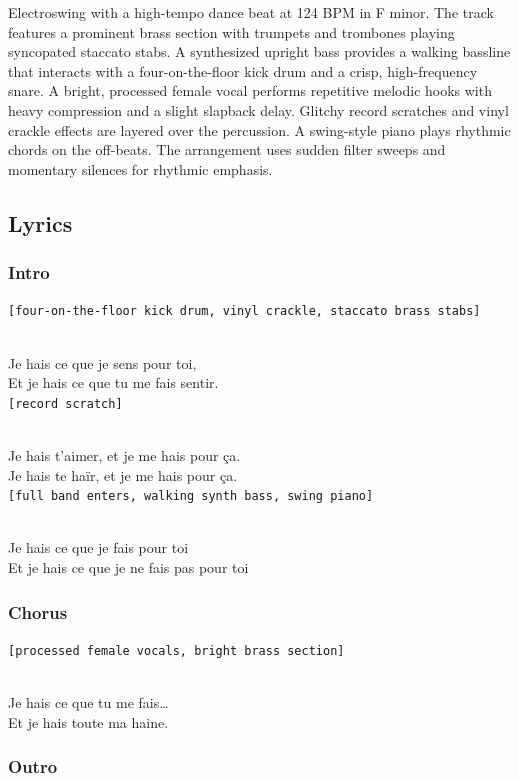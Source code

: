 \documentclass[]{article}
\begin{document}
Electroswing with a high-tempo dance beat at 124 BPM in F minor. The
track features a prominent brass section with trumpets and trombones
playing syncopated staccato stabs. A synthesized upright bass provides a
walking bassline that interacts with a four-on-the-floor kick drum and a
crisp, high-frequency snare. A bright, processed female vocal performs
repetitive melodic hooks with heavy compression and a slight slapback
delay. Glitchy record scratches and vinyl crackle effects are layered
over the percussion. A swing-style piano plays rhythmic chords on the
off-beats. The arrangement uses sudden filter sweeps and momentary
silences for rhythmic emphasis.

\subsection{Lyrics}\label{lyrics-19}

\subsubsection{Intro}\label{intro-8}

\texttt{{[}four-on-the-floor\ kick\ drum,\ vinyl\ crackle,\ staccato\ brass\ stabs{]}}\strut \\
Je hais ce que je sens pour toi,\\
Et je hais ce que tu me fais sentir.\\
\texttt{{[}record\ scratch{]}}\strut \\
Je hais t'aimer, et je me hais pour ça.\\
Je hais te haïr, et je me hais pour ça.\\
\texttt{{[}full\ band\ enters,\ walking\ synth\ bass,\ swing\ piano{]}}\strut \\
Je hais ce que je fais pour toi\\
Et je hais ce que je ne fais pas pour toi

\subsubsection{Chorus}\label{chorus-30}

\texttt{{[}processed\ female\ vocals,\ bright\ brass\ section{]}}\strut \\
Je hais ce que tu me fais\ldots{}\\
Et je hais toute ma haine.

\subsubsection{Outro}\label{outro-4}
\end{document}
